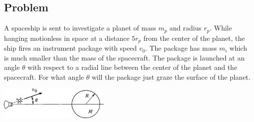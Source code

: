 \documentclass[solutions]{esg8012pset}
\begin{document}
\subsection*{Problem}
  A spaceship is sent to investigate a planet of mass $m_p$ and radius $r_p$. While hanging motionless in space at a distance $5 r_p$ from the center of the planet, the ship fires an instrument package with speed $v_0$. The package has mass $m_i$ which is much smaller than the mass of the spacecraft. The package is launched at an angle $\theta$ with respect to a radial line between the center of the planet and the spacecraft. For what angle $\theta$ will the package just graze the surface of the planet.
  \begin{center}\includegraphics[width=0.4\textwidth]{ps08_2}\end{center}
\end{document}
